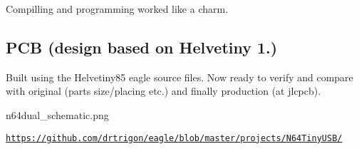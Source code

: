 Compilling and programming worked like a charm.

\subsection*{P\-C\-B (design based on Helvetiny 1.)}

Built using the Helvetiny85 eagle source files. Now ready to verify and compare with original (parts size/placing etc.) and finally production (at jlcpcb).

n64dual\-\_\-schematic.\-png

\href{https://github.com/drtrigon/eagle/blob/master/projects/N64TinyUSB/}{\tt https\-://github.\-com/drtrigon/eagle/blob/master/projects/\-N64\-Tiny\-U\-S\-B/} 